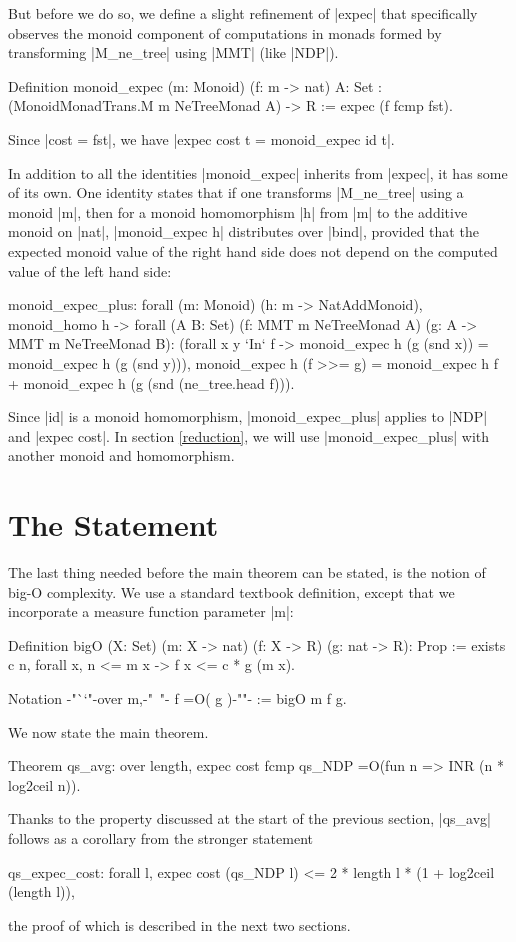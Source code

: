 \documentclass[runningheads]{llncs}
\begin{document}
But before we do so, we define a slight refinement of |expec| that specifically observes the monoid component of computations in monads formed by transforming |M_ne_tree| using |MMT| (like |NDP|).
\begin{code}
  Definition monoid_expec (m: Monoid) (f: m -> nat) {A: Set}
    : (MonoidMonadTrans.M m NeTreeMonad A) -> R := expec (f fcmp fst).
\end{code}
Since |cost = fst|, we have |expec cost t = monoid_expec id t|.

In addition to all the identities |monoid_expec| inherits from |expec|, it has some of its own. One identity states that if one transforms |M_ne_tree| using a monoid |m|, then for a monoid homomorphism |h| from |m| to the additive monoid on |nat|, |monoid_expec h| distributes over |bind|, provided that the expected monoid value of the right hand side does not depend on the computed value of the left hand side:

\begin{code}
  monoid_expec_plus: forall (m: Monoid) (h: m -> NatAddMonoid),
    monoid_homo h -> forall (A B: Set)
    (f: MMT m NeTreeMonad A) (g: A -> MMT m NeTreeMonad B):
    (forall x y `In` f -> monoid_expec h (g (snd x)) = monoid_expec h (g (snd y))),
    monoid_expec h (f >>= g) =
      monoid_expec h f + monoid_expec h (g (snd (ne_tree.head f))).
\end{code}

Since |id| is a monoid homomorphism, |monoid_expec_plus| applies to |NDP| and |expec cost|. In section \ref{reduction}, we will use |monoid_expec_plus| with another monoid and homomorphism.

\section{The Statement}
\label{statement}

The last thing needed before the main theorem can be stated, is the notion of big-O complexity. We use a standard textbook definition, except that we incorporate a measure function parameter |m|:

\begin{code}
  Definition bigO (X: Set) (m: X -> nat) (f: X -> R) (g: nat -> R): Prop
      := exists c n, forall x, n <= m x -> f x <= c * g (m x).

  Notation {-"``"-}over m,{-"\ "-} f =O( g ){-""-} := bigO m f g.
\end{code}
We now state the main theorem.
\begin{code}
  Theorem qs_avg: over length, expec cost fcmp qs_NDP =O(fun n => INR (n * log2ceil n)).
\end{code}
Thanks to the property discussed at the start of the previous section, %
|qs_avg| follows as a corollary from the stronger statement
\begin{code}
  qs_expec_cost: forall l, expec cost (qs_NDP l) <= 2 * length l * (1 + log2ceil (length l)),
\end{code}
the proof of which is described in the next two sections.
\end{document}
